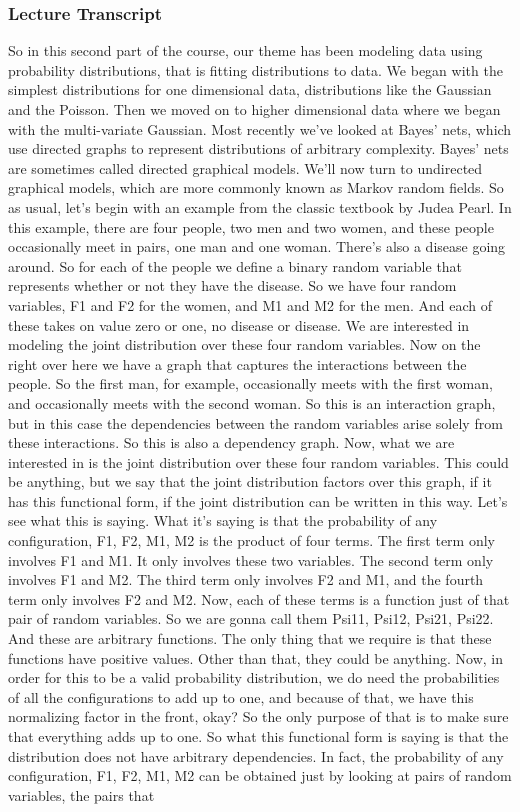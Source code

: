 \documentclass{article}
\begin{document}
\subsubsection*{Lecture Transcript}
\begin{flushleft}
    So in this second part of the course, our theme has been modeling data using probability distributions, that is fitting distributions to data. We began with the simplest distributions for one dimensional data, distributions like the Gaussian and the Poisson. Then we moved on to higher dimensional data where we began with the multi-variate Gaussian. Most recently we've looked at Bayes' nets, which use directed graphs to represent distributions of arbitrary complexity. Bayes' nets are sometimes called directed graphical models. We'll now turn to undirected graphical models, which are more commonly known as Markov random fields. So as usual, let's begin with an example from the classic textbook by Judea Pearl. In this example, there are four people, two men and two women, and these people occasionally meet in pairs, one man and one woman. There's also a disease going around. So for each of the people we define a binary random variable that represents whether or not they have the disease. So we have four random variables, F1 and F2 for the women, and M1 and M2 for the men. And each of these takes on value zero or one, no disease or disease. We are interested in modeling the joint distribution over these four random variables. Now on the right over here we have a graph that captures the interactions between the people. So the first man, for example, occasionally meets with the first woman, and occasionally meets with the second woman. So this is an interaction graph, but in this case the dependencies between the random variables arise solely from these interactions. So this is also a dependency graph. Now, what we are interested in is the joint distribution over these four random variables. This could be anything, but we say that the joint distribution factors over this graph, if it has this functional form, if the joint distribution can be written in this way. Let's see what this is saying. What it's saying is that the probability of any configuration, F1, F2, M1, M2 is the product of four terms. The first term only involves F1 and M1. It only involves these two variables. The second term only involves F1 and M2. The third term only involves F2 and M1, and the fourth term only involves F2 and M2. Now, each of these terms is a function just of that pair of random variables. So we are gonna call them Psi11, Psi12, Psi21, Psi22. And these are arbitrary functions. The only thing that we require is that these functions have positive values. Other than that, they could be anything. Now, in order for this to be a valid probability distribution, we do need the probabilities of all the configurations to add up to one, and because of that, we have this normalizing factor in the front, okay? So the only purpose of that is to make sure that everything adds up to one. So what this functional form is saying is that the distribution does not have arbitrary dependencies. In fact, the probability of any configuration, F1, F2, M1, M2 can be obtained just by looking at pairs of random variables, the pairs that 
\end{flushleft}
\end{document}

